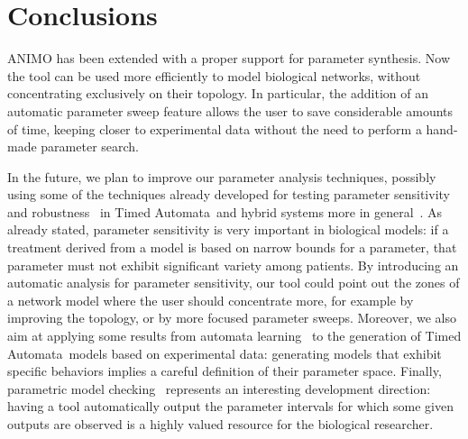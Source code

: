 \documentclass[submission,copyright,creativecommons]{eptcs}
\def\tas{Timed Automata}
\begin{document}
\section{Conclusions}
ANIMO has been extended with a proper support for parameter synthesis. Now the tool can be used more efficiently
to model biological networks, without concentrating exclusively on their topology.
In particular, the addition of an automatic parameter sweep feature allows the user
to save considerable amounts of time, keeping closer to experimental data without the need
to perform a hand-made parameter search.

In the future, we plan to improve our parameter analysis techniques, possibly using some of
the techniques already developed for testing parameter sensitivity~\cite{inverse-ta1, inverse-ta2} and
robustness~\cite{robust-ta1, robust-ta2, robust-ta3, robust-ta4} in \tas\ and hybrid systems more in general~\cite{decidability-ta-ha, imitator2}.
As already stated, parameter sensitivity is very important in biological models: if a treatment
derived from a model is based on narrow bounds for a parameter, that parameter must not exhibit significant
variety among patients. By introducing an automatic analysis for parameter sensitivity, our tool
could point out the zones of a network model where the user should concentrate more, for example by
improving the topology, or by more focused parameter sweeps.
Moreover, we also aim at applying some results from automata learning~\cite{test-based-modelling} to the generation of
\tas\ models based on experimental data: generating models that exhibit specific behaviors
implies a careful definition of their parameter space.
Finally, parametric model checking~\cite{param-mc} represents an interesting development direction:
having a tool automatically output the parameter intervals for which some
given outputs are observed is a highly valued resource for the biological researcher.
\end{document}

